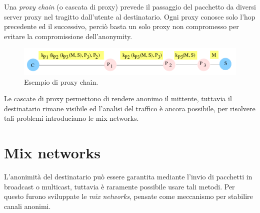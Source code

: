 \documentclass[a4paper, 11pt, notitlepage, fleqn]{report}
\begin{document}
Una \emph{proxy chain} (o cascata di proxy) prevede il passaggio del pacchetto da diversi server proxy nel tragitto dall'utente al destinatario. Ogni proxy conosce solo l'hop precedente ed il successivo, perciò basta un solo proxy non compromesso per evitare la compromissione dell'anonymity.
\begin{figure}[htp]
	\centering
	\includegraphics[width=\textwidth]{images/proxychain}
	\caption{Esempio di proxy chain.}
\end{figure}

Le cascate di proxy permettono di rendere anonimo il mittente, tuttavia il destinatario rimane visibile ed l'analisi del traffico è ancora possibile, per risolvere tali problemi introduciamo le mix networks.

\section{Mix networks}
L'anonimità del destinatario può essere garantita mediante l'invio di pacchetti in broadcast o multicast, tuttavia è raramente possibile usare tali metodi. Per questo furono sviluppate le \emph{mix networks}, pensate come meccanismo per stabilire canali anonimi.
\end{document}
